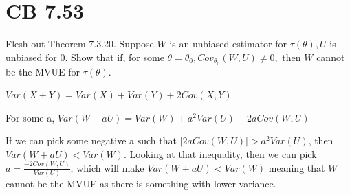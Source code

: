 \documentclass{article}
\begin{document}
\section{CB 7.53}

Flesh out Theorem 7.3.20. Suppose $W$ is an unbiased estimator for $\tau(\theta), U$ is unbiased for 0. Show that if, for some $\theta = \theta_0, Cov_{\theta_0}(W, U) \neq 0,$ then $W$ cannot be the MVUE for $\tau(\theta)$.

$Var(X+Y) = Var(X) + Var(Y) + 2Cov(X,Y)$

For some a, $Var(W + aU) = Var(W) + a^2Var(U) + 2aCov(W, U)$

If we can pick some negative a such that $|2aCov(W, U)| > a^2Var(U)$, then $Var(W + aU) < Var(W)$. Looking at that inequality, then we can pick $a = \frac{-2Cov(W, U)}{Var(U)}$, which will make $Var(W + aU) < Var(W)$ meaning that $W$ cannot be the MVUE as there is something with lower variance. 
\end{document}
